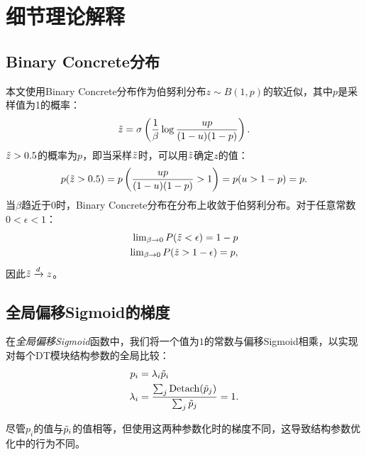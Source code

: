 \section{细节理论解释}
\subsection{Binary Concrete分布}
\label{app:theory:BCD}
本文使用Binary Concrete分布作为伯努利分布$z\sim B(1,p)$的软近似，其中$p$是采样值为1的概率：
\begin{equation}
    \Tilde{z} = \sigma\left(\frac1\beta \operatorname{log}\frac{up}{(1-u)(1-p)}\right).
\end{equation}
$\Tilde{z}>0.5$的概率为$p$，即当采样$\Tilde{z}$时，可以用$\Tilde{z}$确定$z$的值：
\begin{equation}
    p(\Tilde{z}>0.5) = p\left(\frac{up}{(1-u)(1-p)}>1\right) = p(u>1-p) = p.
\end{equation}
当$\beta$趋近于$0$时，Binary Concrete分布在分布上收敛于伯努利分布。对于任意常数$0<\epsilon<1$：
\begin{align}
    \operatorname{lim}_{\beta\rightarrow 0} P(\Tilde{z}<\epsilon) = 1-p \\
    \operatorname{lim}_{\beta\rightarrow 0} P(\Tilde{z}>1-\epsilon) = p,
\end{align}
因此$\Tilde{z} \xrightarrow{d} z$。


\subsection{全局偏移Sigmoid的梯度}
\label{app:Gradient}
在\emph{全局偏移Sigmoid}函数中，我们将一个值为$1$的常数与偏移Sigmoid相乘，以实现对每个DT模块结构参数的全局比较：
\begin{align}
    {p_i} & = \lambda_i \Tilde{p}_i \\
    \lambda_i & = \frac{\sum_j \operatorname{Detach}( \Tilde{p}_j)}{\sum_j  \Tilde{p}_j}=1.
\end{align}

尽管$p_i$的值与$\Tilde{p}_i$的值相等，但使用这两种参数化时的梯度不同，这导致结构参数优化中的行为不同。

